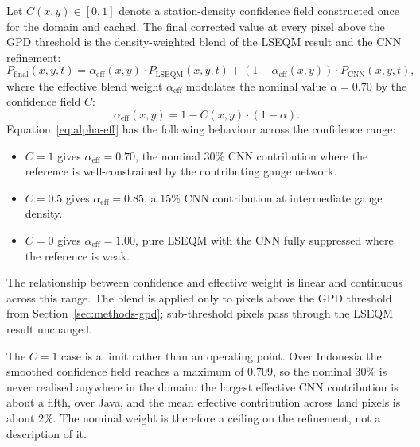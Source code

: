 Let $C(x, y) \in [0, 1]$ denote a station-density confidence
field constructed once for the domain and cached. The final
corrected value at every pixel above the GPD threshold is the
density-weighted blend of the LSEQM result and the CNN refinement:
\begin{equation}
P_{\text{final}}(x, y, t) =
\alpha_{\text{eff}}(x, y) \cdot P_{\text{LSEQM}}(x, y, t)
+ (1 - \alpha_{\text{eff}}(x, y)) \cdot P_{\text{CNN}}(x, y, t),
\label{eq:blend}
\end{equation}
where the effective blend weight $\alpha_{\text{eff}}$ modulates
the nominal value $\alpha = 0.70$ by the confidence field $C$:
\begin{equation}
\alpha_{\text{eff}}(x, y) = 1 - C(x, y) \cdot (1 - \alpha).
\label{eq:alpha-eff}
\end{equation}
Equation~\ref{eq:alpha-eff} has the following behaviour across
the confidence range:
\begin{itemize}
    \item $C = 1$ gives $\alpha_{\text{eff}} = 0.70$, the
    nominal $30\%$ CNN contribution where the reference is
    well-constrained by the contributing gauge network.
    \item $C = 0.5$ gives $\alpha_{\text{eff}} = 0.85$, a
    $15\%$ CNN contribution at intermediate gauge density.
    \item $C = 0$ gives $\alpha_{\text{eff}} = 1.00$, pure
    LSEQM with the CNN fully suppressed where the reference is
    weak.
\end{itemize}
The relationship between confidence and effective weight is
linear and continuous across this range. The blend is applied
only to pixels above the GPD threshold from
Section~\ref{sec:methods-gpd}; sub-threshold pixels pass
through the LSEQM result unchanged.

The $C = 1$ case is a limit rather than an operating point. Over
Indonesia the smoothed confidence field reaches a maximum of
$0.709$, so the nominal $30\%$ is never realised anywhere in the
domain: the largest effective CNN contribution is about a fifth,
over Java, and the mean effective contribution across land pixels
is about $2\%$. The nominal weight is therefore a ceiling on the
refinement, not a description of it.

